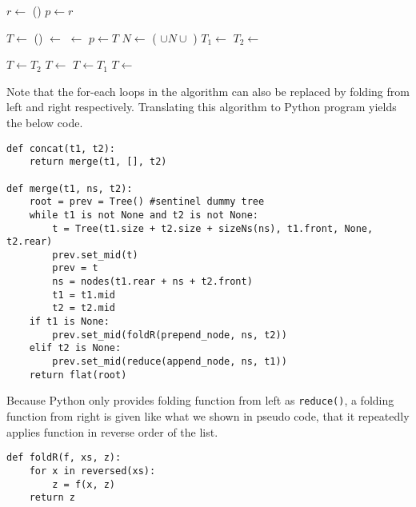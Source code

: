 \documentclass[UTF8]{article}
\begin{document}
\begin{algorithmic}
  \State \Return {}
\EndFunction
\Statex
{}
  \State $r \gets$ ()
  \State $p \gets r$

    \State $T \gets$ ()
    \State {} $\gets$ 
    \State {} $\gets$ 
    \State {}
    \State $p \gets T$
    \State $N \gets$ ( $\cup N \cup$ )
    \State $T_1 \gets$ 
    \State $T_2 \gets$ 
  \EndWhile

    \State $T \gets T_2$
      \State $T \gets$ 
    \EndFor
    \State $T \gets T_1$
      \State $T \gets$ 
    \EndFor
  \EndIf
  \State {}

  \State \Return {}
\EndFunction
\end{algorithmic}

Note that the for-each loops in the algorithm can also be replaced by folding from left
and right respectively. Translating this algorithm to Python program yields the below code.

\lstset{language=Python}
\begin{lstlisting}
def concat(t1, t2):
    return merge(t1, [], t2)

def merge(t1, ns, t2):
    root = prev = Tree() #sentinel dummy tree
    while t1 is not None and t2 is not None:
        t = Tree(t1.size + t2.size + sizeNs(ns), t1.front, None, t2.rear)
        prev.set_mid(t)
        prev = t
        ns = nodes(t1.rear + ns + t2.front)
        t1 = t1.mid
        t2 = t2.mid
    if t1 is None:
        prev.set_mid(foldR(prepend_node, ns, t2))
    elif t2 is None:
        prev.set_mid(reduce(append_node, ns, t1))
    return flat(root)
\end{lstlisting}

Because Python only provides folding function from left as \verb|reduce()|, a folding function
from right is given like what we shown in pseudo code, that it repeatedly applies function
in reverse order of the list.

\begin{lstlisting}
def foldR(f, xs, z):
    for x in reversed(xs):
        z = f(x, z)
    return z
\end{lstlisting}
\end{document}
